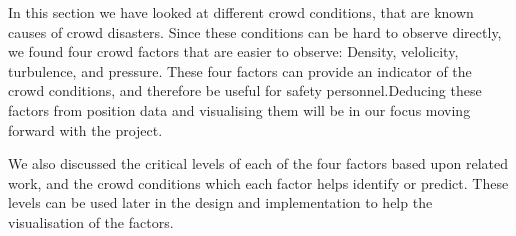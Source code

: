 In this section we have looked at different crowd conditions, that are known causes of crowd disasters. Since these conditions can be hard to observe directly, we found four crowd factors that are easier to observe: Density, velolicity, turbulence, and pressure. These four factors can provide an indicator of the crowd conditions, and therefore be useful for safety personnel.Deducing these factors from position data and visualising them will be in our focus moving forward with the project.

We also discussed the critical levels of each of the four factors based upon related work, and the crowd conditions which each factor helps identify or predict. These levels can be used later in the design and implementation to help the visualisation of the factors.